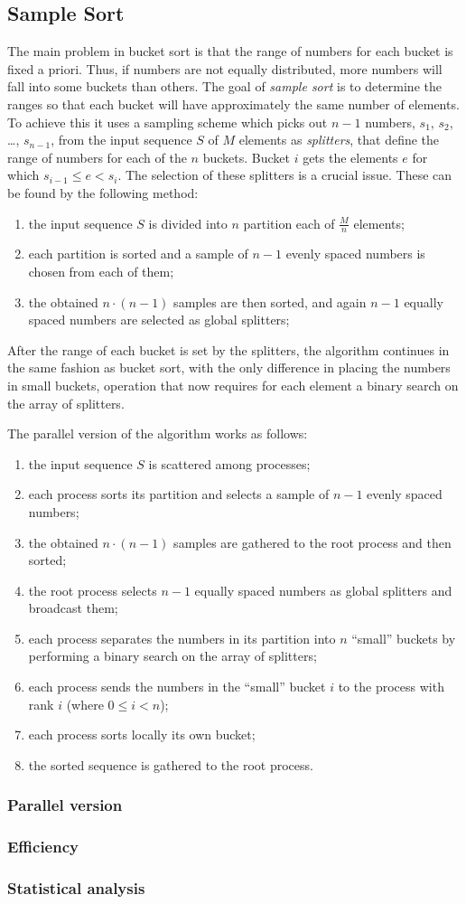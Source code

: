 \subsection{Sample Sort}
The main problem in bucket sort is that the range of numbers for each bucket is fixed a priori. Thus, if numbers are not equally distributed, more numbers will fall into some buckets than others.
The goal of \textit{sample sort} is to determine the ranges so that each bucket will have approximately the same number of elements. To achieve this it uses a sampling scheme which picks out $n-1$ numbers, $s_1$, $s_2$, \dots, $s_{n-1}$, from the input sequence $S$ of $M$ elements as \textit{splitters}, that define the range of numbers for each of the $n$ buckets. Bucket $i$ gets the elements $e$ for which $s_{i-1} \leq e < s_i$. The selection of these splitters is a crucial issue. These can be found by the following method:
\begin{enumerate}	
	\item the input sequence $S$ is divided into $n$ partition each of $\frac{M}{n}$ elements;
	\item each partition is sorted and a sample of $n-1$ evenly spaced numbers is chosen from each of them;
	\item the obtained $n \cdot (n-1)$ samples are then sorted, and again $n-1$ equally spaced numbers are selected as global splitters;
\end{enumerate}
After the range of each bucket is set by the splitters, the algorithm continues in the same fashion as bucket sort, with the only difference in placing the numbers in small buckets, operation that now requires for each element a binary search on the array of splitters.

The parallel version of the algorithm works as follows:
\begin{enumerate}	
	\item the input sequence $S$ is scattered among processes;
	\item each process sorts its partition and selects a sample of $n-1$ evenly spaced numbers;
	\item the obtained $n \cdot (n-1)$ samples are gathered to the root process and then sorted;
	\item the root process selects $n-1$ equally spaced numbers as global splitters and broadcast them;
	\item each process separates the numbers in its partition into $n$ ``small'' buckets by performing a binary search on the array of splitters;
	\item each process sends the numbers in the ``small'' bucket $i$ to the process with rank $i$ (where $0 \leq i < n$);
	\item each process sorts locally its own bucket;
	\item the sorted sequence is gathered to the root process.
\end{enumerate}

 

\subsubsection*{Parallel version}
\subsubsection*{Efficiency} 
\subsubsection*{Statistical analysis}